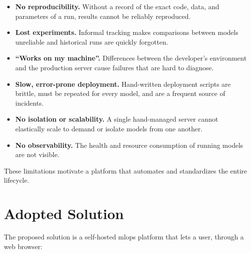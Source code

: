 \begin{itemize}[leftmargin=1.4em]
  \item \textbf{No reproducibility.} Without a record of the exact code, data, and
        parameters of a run, results cannot be reliably reproduced.
  \item \textbf{Lost experiments.} Informal tracking makes comparisons between
        models unreliable and historical runs are quickly forgotten.
  \item \textbf{``Works on my machine''.} Differences between the developer's
        environment and the production server cause failures that are hard to
        diagnose.
  \item \textbf{Slow, error-prone deployment.} Hand-written deployment scripts are
        brittle, must be repeated for every model, and are a frequent source of
        incidents.
  \item \textbf{No isolation or scalability.} A single hand-managed server cannot
        elastically scale to demand or isolate models from one another.
  \item \textbf{No observability.} The health and resource consumption of running
        models are not visible.
\end{itemize}

These limitations motivate a platform that automates and standardizes the entire
lifecycle.

\section{Adopted Solution}
\label{sec:solution}
The proposed solution is a self-hosted \gls{mlops} platform that lets a user,
through a web browser:


